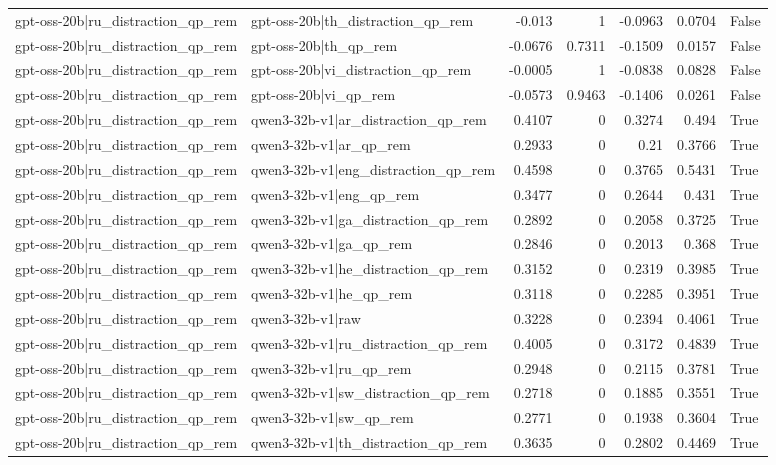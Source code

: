 \begin{table}
\begin{tabular}{l l r r r r l}
gpt-oss-20b|ru_distraction_qp_rem & gpt-oss-20b|th_distraction_qp_rem & -0.013 & 1 & -0.0963 & 0.0704 & False \\
gpt-oss-20b|ru_distraction_qp_rem & gpt-oss-20b|th_qp_rem & -0.0676 & 0.7311 & -0.1509 & 0.0157 & False \\
gpt-oss-20b|ru_distraction_qp_rem & gpt-oss-20b|vi_distraction_qp_rem & -0.0005 & 1 & -0.0838 & 0.0828 & False \\
gpt-oss-20b|ru_distraction_qp_rem & gpt-oss-20b|vi_qp_rem & -0.0573 & 0.9463 & -0.1406 & 0.0261 & False \\
gpt-oss-20b|ru_distraction_qp_rem & qwen3-32b-v1|ar_distraction_qp_rem & 0.4107 & 0 & 0.3274 & 0.494 & True \\
gpt-oss-20b|ru_distraction_qp_rem & qwen3-32b-v1|ar_qp_rem & 0.2933 & 0 & 0.21 & 0.3766 & True \\
gpt-oss-20b|ru_distraction_qp_rem & qwen3-32b-v1|eng_distraction_qp_rem & 0.4598 & 0 & 0.3765 & 0.5431 & True \\
gpt-oss-20b|ru_distraction_qp_rem & qwen3-32b-v1|eng_qp_rem & 0.3477 & 0 & 0.2644 & 0.431 & True \\
gpt-oss-20b|ru_distraction_qp_rem & qwen3-32b-v1|ga_distraction_qp_rem & 0.2892 & 0 & 0.2058 & 0.3725 & True \\
gpt-oss-20b|ru_distraction_qp_rem & qwen3-32b-v1|ga_qp_rem & 0.2846 & 0 & 0.2013 & 0.368 & True \\
gpt-oss-20b|ru_distraction_qp_rem & qwen3-32b-v1|he_distraction_qp_rem & 0.3152 & 0 & 0.2319 & 0.3985 & True \\
gpt-oss-20b|ru_distraction_qp_rem & qwen3-32b-v1|he_qp_rem & 0.3118 & 0 & 0.2285 & 0.3951 & True \\
gpt-oss-20b|ru_distraction_qp_rem & qwen3-32b-v1|raw & 0.3228 & 0 & 0.2394 & 0.4061 & True \\
gpt-oss-20b|ru_distraction_qp_rem & qwen3-32b-v1|ru_distraction_qp_rem & 0.4005 & 0 & 0.3172 & 0.4839 & True \\
gpt-oss-20b|ru_distraction_qp_rem & qwen3-32b-v1|ru_qp_rem & 0.2948 & 0 & 0.2115 & 0.3781 & True \\
gpt-oss-20b|ru_distraction_qp_rem & qwen3-32b-v1|sw_distraction_qp_rem & 0.2718 & 0 & 0.1885 & 0.3551 & True \\
gpt-oss-20b|ru_distraction_qp_rem & qwen3-32b-v1|sw_qp_rem & 0.2771 & 0 & 0.1938 & 0.3604 & True \\
gpt-oss-20b|ru_distraction_qp_rem & qwen3-32b-v1|th_distraction_qp_rem & 0.3635 & 0 & 0.2802 & 0.4469 & True \\

\end{tabular}
\end{table}
